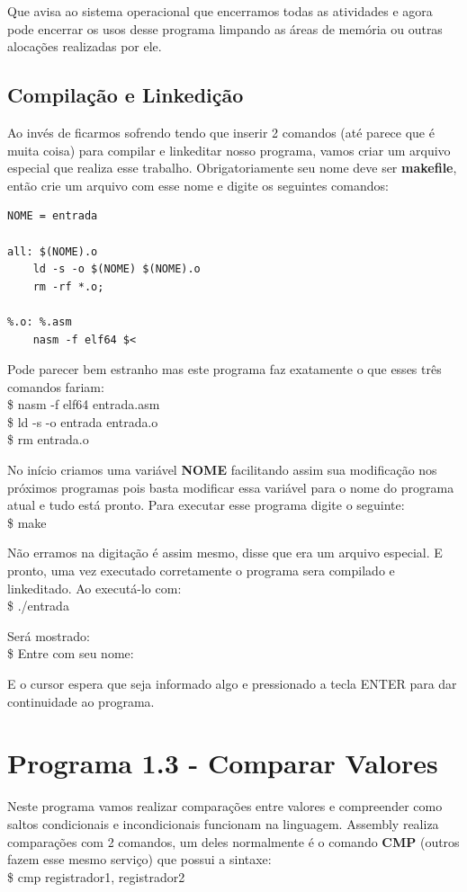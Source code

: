 Que avisa ao sistema operacional que encerramos todas as atividades e agora pode encerrar os usos desse programa limpando as áreas de memória ou outras alocações realizadas por ele.

\subsection{Compilação e Linkedição}

Ao invés de ficarmos sofrendo tendo que inserir 2 comandos (até parece que é muita coisa) para compilar e linkeditar nosso programa, vamos criar um arquivo especial que realiza esse trabalho. Obrigatoriamente seu nome deve ser \textbf{makefile}, então crie um arquivo com esse nome e digite os seguintes comandos:
\begin{lstlisting}[]
NOME = entrada

all: $(NOME).o
	ld -s -o $(NOME) $(NOME).o
	rm -rf *.o;

%.o: %.asm
	nasm -f elf64 $<
\end{lstlisting}

Pode parecer bem estranho mas este programa faz exatamente o que esses três comandos fariam: \\
{\ttfamily\$ nasm -f elf64 entrada.asm} \\
{\ttfamily\$ ld -s -o entrada entrada.o} \\
{\ttfamily\$ rm entrada.o}

No início criamos uma variável \textbf{NOME} facilitando assim sua modificação nos próximos programas pois basta modificar essa variável para o nome do programa atual e tudo está pronto. Para executar esse programa digite o seguinte: \\
{\ttfamily\$ make}

Não erramos na digitação é assim mesmo, disse que era um arquivo especial. E pronto, uma vez executado corretamente o programa sera compilado e linkeditado. Ao executá-lo com: \\
{\ttfamily\$ ./entrada}

Será mostrado: \\
{\ttfamily\$ Entre com seu nome:}

E o cursor espera que seja informado algo e pressionado a tecla ENTER para dar continuidade ao programa.

\section{Programa 1.3 - Comparar Valores}
Neste programa vamos realizar comparações entre valores e compreender como saltos condicionais e incondicionais funcionam na linguagem. Assembly realiza comparações com 2 comandos, um deles normalmente é o comando \textbf{CMP} (outros fazem esse mesmo serviço) que possui a sintaxe: \\
{\ttfamily\$ cmp registrador1, registrador2}

